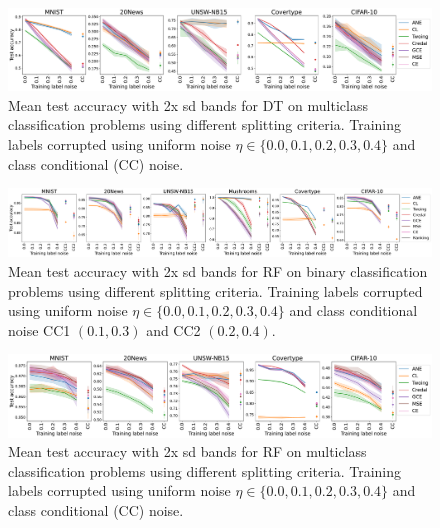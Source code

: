 \documentclass[letterpaper]{article} %
\begin{document}
\begin{figure}[h!]
    \centering
    \includegraphics[width=0.87\linewidth]{figs/multiclass_classification,DT_classfier.pdf}
    \caption{
    Mean test accuracy with 2x sd bands for DT on multiclass classification problems using different splitting criteria.
    Training labels corrupted using uniform noise $\eta\in\{0.0,0.1,0.2,0.3,0.4\}$ and class conditional (CC) noise.
    }
    \label{fig:dt-mc}
\end{figure}

\begin{figure}[h!]
    \centering
    \includegraphics[width=0.97\linewidth]{figs/binary_classification,RF_classfier.pdf}
    \caption{
    Mean test accuracy with 2x sd bands for RF on binary classification problems using different splitting criteria.
    Training labels corrupted using
    uniform noise $\eta\in\{0.0,0.1,0.2,0.3,0.4\}$ and class conditional noise CC1 $(0.1,0.3)$ and CC2 $(0.2,0.4)$.
    }
    \label{fig:rf-bin}
\end{figure}

\begin{figure}[h!]
    \centering
    \includegraphics[width=0.87\linewidth]{figs/multiclass_classification,RF_classfier.pdf}
    \caption{
    Mean test accuracy with 2x sd bands for RF on multiclass classification problems using different splitting criteria.
    Training labels corrupted using uniform noise $\eta\in\{0.0,0.1,0.2,0.3,0.4\}$ and class conditional (CC) noise.
    }
    \label{fig:rf-mc}
\end{figure}
\end{document}
